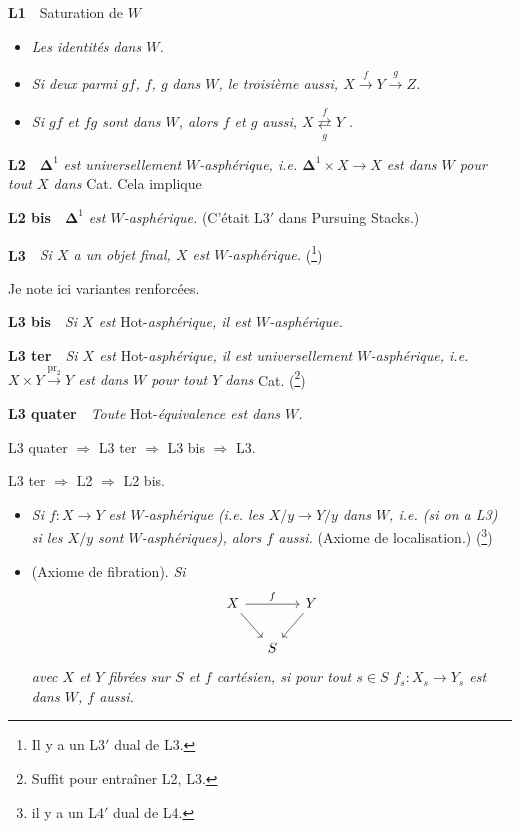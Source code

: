 \documentclass[11pt]{article}
\newcommand{\printedpage}[1]{\marginpar{\footnotesize p.~#1}}
\newcommand{\msp}[1]{\marginpar{\footnotesize [#1]}}
\begin{document}
\noindent\textbf{L1}\ \ Saturation de $W$

\begin{itemize}[leftmargin=2.5em]
\item[a)] \textit{Les identités} \textit{dans $W$.}
\item[b)] \textit{Si deux parmi $gf$, $f$, $g$} \textit{dans $W$, le troisième aussi, $X \xrightarrow{f} Y \xrightarrow{g} Z$.}
\item[c)] \textit{Si $gf$ et $fg$ sont dans $W$, alors $f$ et $g$ aussi, $X \overset{f}{\underset{g}{\rightleftarrows}} Y$ .}
\end{itemize}

\noindent\textbf{L2}\ \ $\mathbf{\Delta}^1$ \textit{est universellement $W$-asphérique, i.e. $\mathbf{\Delta}^1 \times X \longrightarrow X$ est dans $W$ pour tout $X$ dans} Cat. Cela implique

\noindent\textbf{L2 bis}\ \ $\mathbf{\Delta}^1$ \textit{est $W$-asphérique.} (C'était L3$'$ dans Pursuing Stacks.)

\noindent\textbf{L3}\ \ \textit{Si $X$ a un objet final, $X$ est $W$-asphérique.} (\footnote[1]{Il y a un L3$'$ dual de L3.})

\noindent Je note ici variantes renforcées.

\noindent\textbf{L3 bis}\ \ \textit{Si $X$ est} Hot-\textit{asphérique, il est $W$-asphérique.}

\noindent\textbf{L3 ter}\ \ \textit{Si $X$ est} Hot-\textit{asphérique, il est universellement $W$-asphérique, i.e. $X \times Y \xrightarrow{\mathrm{pr}_2} Y$ est dans $W$ pour tout $Y$ dans} Cat. (\footnote[2]{Suffit pour entraîner L2, L3.})

\clearpage

\noindent\printedpage{2}
\textbf{L3 quater}\ \ \textit{Toute} Hot-\textit{équivalence est dans $W$.}

\noindent L3 quater $\Longrightarrow$ L3 ter $\Longrightarrow$ L3 bis $\Longrightarrow$ L3.

\noindent L3 ter $\Longrightarrow$ L2 $\Longrightarrow$ L2 bis.

\noindent\msp{page 2}

\begin{itemize}[leftmargin=2.5em]
\item[\textbf{L4}] \textit{Si $f : X \longrightarrow Y$ est $W$-asphérique (i.e. les $X/y \longrightarrow Y/y$ dans $W$, i.e. (si on a L3) si les $X/y$ sont $W$-asphériques), alors $f$ aussi.} (Axiome de localisation.) (\footnote[3]{il y a un L4$'$ dual de L4.})

\item[\textbf{L5}] (Axiome de fibration). \textit{Si}
\[
\begin{tikzcd}[column sep=small]
X \arrow[rr, "f"] \arrow[dr] & & Y \arrow[dl] \\
& S &
\end{tikzcd}
\]
\textit{avec $X$ et $Y$ fibrées sur $S$ et $f$ cartésien, si pour tout $s \in S$ $f_s : X_s \longrightarrow Y_s$ est dans $W$, $f$ aussi.}
\end{itemize}
\end{document}

